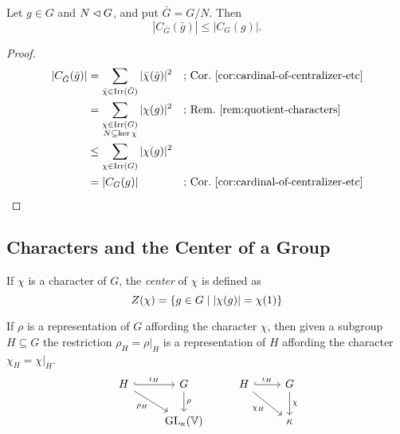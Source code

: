 \begin{thm}
    Let\/ $g\in G$ and\/ $N\lhd G$, and put $\bar G=G/N$. Then
    $$
        |C_{\bar G}(\bar g)|\le|C_G(g)|.
    $$
\end{thm}

\begin{proof}
    \begin{align*}
        |C_{\bar G}(\bar g)|
            &= \sum_{\bar\chi\in\operatorname{Irr}(\bar G)}
                |\bar\chi(\bar g)|^2
                &&\text{; Cor.~\ref{cor:cardinal-of-centralizer-etc}}\\
            &= \sum_{\substack{\chi\in\operatorname{Irr}(G)
                \\N\subseteq\ker\chi}}
                |\chi(g)|^2
                &&\text{; Rem.~\ref{rem:quotient-characters}}\\
            &\le \sum_{\chi\in\operatorname{Irr}(G)}
                |\chi(g)|^2\\
            &= |C_G(g)|
                &&\text{; Cor.~\ref{cor:cardinal-of-centralizer-etc}}
    \end{align*}
\end{proof}

\subsection{Characters and the Center of a Group}

\begin{defn}
    If $\chi$ is a character of $G$, the \textsl{center} of $\chi$ is defined as
    $$
        Z(\chi) = \{g\in G\mid|\chi(g)|=\chi(1)\}
    $$
\end{defn}

\begin{ntn}
    If $\rho$ is a representation of $G$ affording the character $\chi$, then given a subgroup $H\subseteq G$ the restriction $\rho_H=\rho|_H$ is a representation of $H$ affording the character $\chi_H=\chi|_H$.
    $$
        \begin{tikzcd}
            H
                    \arrow[r,"\iota_H",hook]
                    \arrow[rd,"\rho_H"']
                &G
                    \arrow[d,"\rho"]
                &H
                    \arrow[r,"\iota_H",hook]
                    \arrow[rd,"\chi_H"']
                &G\arrow[d,"\chi"]\\
                &\Aut_\kappa(\V)
                &&\kappa
        \end{tikzcd}
    $$
\end{ntn}

